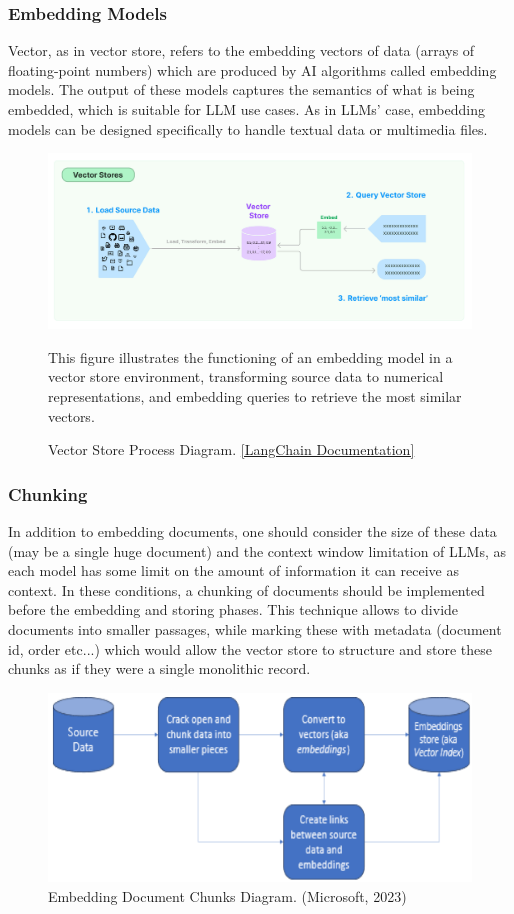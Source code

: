 \subsubsection{Embedding Models}
Vector, as in vector store, refers to the embedding vectors of data (arrays of floating-point numbers) which are produced by AI algorithms called embedding models. The output of these models captures the semantics of what is being embedded, which is suitable for LLM use cases. As in LLMs' case, embedding models can be designed specifically to handle textual data or multimedia files.\newpage
\begin{figure}[htbp]
    \centering
    \includegraphics[width=\linewidth]{./figures/vectorstore.jpg}
    \caption{Vector Store Process Diagram. \href{https://python.langchain.com/v0.1/docs/modules/data_connection/vectorstores/}{[LangChain Documentation]}}
    \begin{flushleft}
        \small This figure illustrates the functioning of an embedding model in a vector store environment, transforming source data to numerical representations, and embedding queries to retrieve the most similar vectors.
    \end{flushleft}
\end{figure}
\subsubsection{Chunking}
In addition to embedding documents, one should consider the size of these data (may be a single huge document) and the context window limitation of LLMs, as each model has some limit on the amount of information it can receive as context. In these conditions, a chunking of documents should be implemented before the embedding and storing phases. This technique allows to divide documents into smaller passages, while marking these with metadata (document id, order etc...) which would allow the vector store to structure and store these chunks as if they were a single monolithic record.
\begin{figure}[htbp]
    \centering
    \includegraphics[width=.7\linewidth]{./figures/chunking-embedding-diagram.png}
    \caption{Embedding Document Chunks Diagram. (Microsoft, 2023)}
\end{figure}\newline
